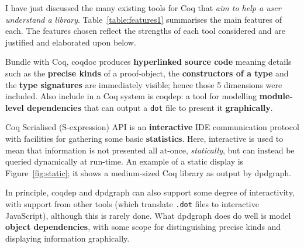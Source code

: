 I have just discussed the many existing tools for Coq that \emph{aim to help a
user understand a library}. Table~\ref{table:features1} summarises the main
features of each. The features chosen reflect the strengths of each tool
considered and are justified and elaborated upon below. 

Bundle with Coq, coqdoc produces \textbf{hyperlinked source code} meaning
details such as the \textbf{precise kinds} of a proof-object, the
\textbf{constructors of a type} and the \textbf{type signatures} are immediately
visible; hence those 5 dimensions were included.  Also include in a Coq system
is coqdep: a tool for modelling \textbf{module-level dependencies} that can
output a \texttt{dot} file to present it \textbf{graphically}.

Coq Serialised (S-expression) API is an \textbf{interactive} IDE communication
protocol with facilities for gathering some basic \textbf{statistics}. Here,
interactive is used to mean that information is not presented all at-once,
\emph{statically}, but can instead be queried dynamically at run-time. An
example of a static display is Figure~\ref{fig:static}; it shows a medium-sized
Coq library as output by dpdgraph.

In principle, coqdep and dpdgraph can also support some degree of interactivity,
with support from other tools (which translate \texttt{.dot} files to interactive
JavaScript), although this is rarely done.  What dpdgraph does do well is model
\textbf{object dependencies}, with some scope for distinguishing precise kinds
and displaying information graphically.


